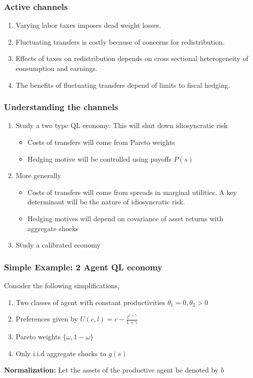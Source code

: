 \documentclass{beamer}
\begin{document}
\begin{frame}
 \frametitle{Active channels}
  \begin{enumerate}
\item Varying labor taxes imposes dead weight losses.


\item Fluctuating transfers is costly because of concerns for redistribution. 

\item Effects of taxes on redistribution depends on cross sectional heterogeneity of consumption and earnings.

\item The benefits of fluctuating transfers depend of limits to fiscal hedging.

\end{enumerate}

 \end{frame}
\begin{frame}
 \frametitle{Understanding the channels}
 \begin{enumerate}
  
  \item Study a two type QL economy: This will shut down idiosyncratic risk  
  \begin{itemize}
   
   \item Costs of transfers will come from Pareto weights
   \item Hedging motive will be controlled using payoffs $P(s)$
  \end{itemize}

  \item More generally 
  \begin{itemize}
   \item Costs of transfers will come from spreads in marginal utilities. A key determinant will be the nature of idiosyncratic risk.
   \item Hedging motives will depend on covariance of asset returns with aggregate shocks
   \end{itemize}
\item Study a calibrated economy  

 \end{enumerate}

 
\end{frame}


\begin{frame}
 \frametitle{Simple Example: 2 Agent QL economy}
 Consider the following simplifications,
 \begin{enumerate}
  \item Two classes of agent with constant productivities $\theta_1=0,\theta_2>0$
  \item Preferences given by $U(c,l)=c-\frac{l^{1+\gamma}}{1+\gamma}$
  \item Pareto weights $\{\omega,1-\omega\}$
  \item Only i.i.d aggregate shocks to $g(s)$
 \end{enumerate}
 
 \textbf{Normalization:} Let the assets of the productive agent be denoted by $b$
\end{frame}
\end{document}
